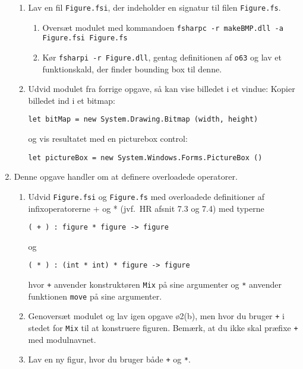 \documentclass[a4paper]{article}
\begin{document}
\begin{enumerate}[ø1.]
\begin{enumerate}
  \item Lav en fil \texttt{Figure.fsi}, der indeholder en signatur til filen \texttt{Figure.fs}.

    \begin{enumerate}
    \item Oversæt modulet med kommandoen \texttt{fsharpc -r makeBMP.dll -a Figure.fsi Figure.fs}

    \item Kør \texttt{fsharpi -r Figure.dll}, gentag definitionen af \texttt{o63} og lav et funktionskald, der finder bounding box til denne.
    \end{enumerate}

  \item Udvid modulet fra forrige opgave, så kan vise billedet i et vindue: Kopier billedet ind i et bitmap:
\begin{verbatim}
let bitMap = new System.Drawing.Bitmap (width, height)
\end{verbatim}
  og vis resultatet med en picturebox control:
\begin{verbatim}
let pictureBox = new System.Windows.Forms.PictureBox ()
\end{verbatim}

  \end{enumerate}
\item Denne opgave handler om at definere overloadede operatorer.

  \begin{enumerate}
  \item  Udvid \texttt{Figure.fsi} og \texttt{Figure.fs} med overloadede
  definitioner af infixoperatorerne + og * (jvf.\ HR afsnit 7.3 og
  7.4) med typerne

  \texttt{( + ) : figure * figure -> figure}

  og

  \texttt{( * ) : (int * int) * figure -> figure}

  hvor \texttt{+} anvender konstruktøren \texttt{Mix} på sine argumenter
  og \texttt{*} anvender funktionen \texttt{move} på sine argumenter.

\item Genoversæt modulet og lav igen opgave ø2(b), men hvor du bruger \texttt{+} i
stedet for \texttt{Mix} til at konstruere figuren.  Bemærk, at du ikke
skal præfixe \texttt{+} med modulnavnet.

\item Lav en ny figur, hvor du bruger både \texttt{+} og \texttt{*}.

  \end{enumerate}
\end{enumerate}
\end{document}
